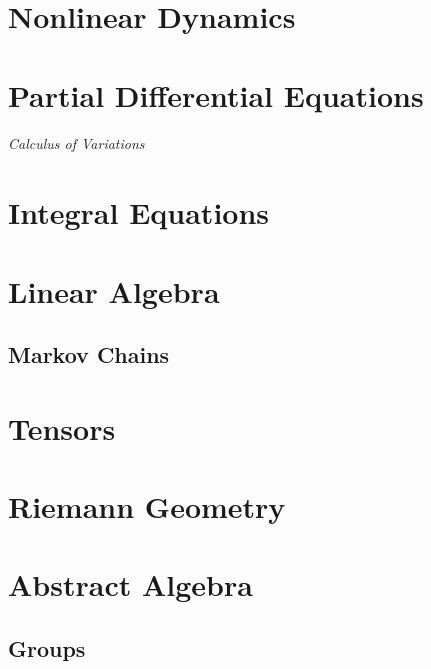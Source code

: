 \documentclass[12pt, english]{book}
\begin{document}
	\part{Nonlinear Dynamics} \label{Nonlinear Dynamics Part}
	
	
	\part{Partial Differential Equations} \label{Partial Differential Equations Part}
	
	\paragraph{Calculus of Variations} \label{Calculus of Variations Part}
	
	\part{Integral Equations} \label{Integral Equations Part}
	
	
	\part{Linear Algebra} \label{Linear Algebra Part}
	
	\chapter{Markov Chains} \label{Markov Chains Chapter - Linear Algebra}
	
	
	\part{Tensors} \label{Tensors Part}
	
	
	\part{Riemann Geometry} \label{Reimann Geometry Part}
	
	
	\part{Abstract Algebra} \label{Abstract Algebra Part}
	
	\chapter{Groups} \label{Groups Chapter - Abstract Algebra}
	
\end{document}
